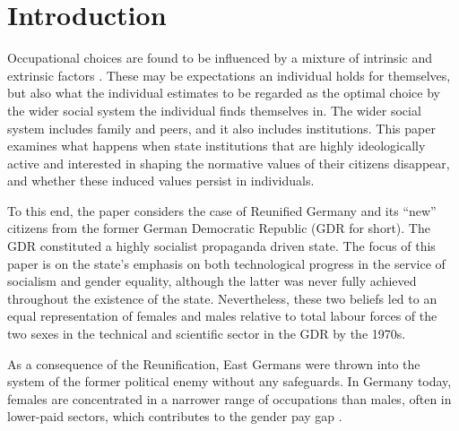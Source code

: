 \documentclass[a4paper, oneside, hyperfootnotes = false]{article}
\begin{document}
{{\begin{center}
\end{center}

}%

\newpage

\section{Introduction}
\label{intro}

Occupational choices are found to be influenced by a mixture of intrinsic and extrinsic factors \citep{Brennan2017, Morales2024}.
These may be expectations an individual holds for themselves, but also what the individual estimates to be regarded as the optimal choice by the wider social system the individual finds themselves in.
The wider social system includes family and peers, and it also includes institutions.
This paper examines what happens when state institutions that are highly ideologically active and interested in shaping the normative values of their citizens disappear, and whether these induced values persist in individuals.

To this end, the paper considers the case of Reunified Germany and its ``new'' citizens from the former German Democratic Republic (GDR for short). The GDR constituted a highly socialist propaganda driven state.
The focus of this paper is on the state's emphasis on both technological progress in the service of socialism and gender equality, although the latter was never fully achieved throughout the existence of the state.
Nevertheless, these two beliefs led to an equal representation of females and males relative to total labour forces of the two sexes in the technical and scientific sector in the GDR by the 1970s.

As a consequence of the Reunification, East Germans were thrown into the system of the former political enemy without any safeguards.
In Germany today, females are concentrated in a narrower range of occupations than males, often in lower-paid sectors, which contributes to the gender pay gap \citep{Kleinert2023, OECD2022}.

}
\end{document}
